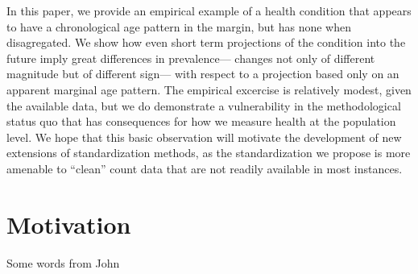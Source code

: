 \documentclass[11pt,oneside,a4paper]{article} %
\begin{document}
In this paper, we provide an empirical example of a health condition that
appears to have a chronological age pattern in the margin, but has none when
disagregated. We show how even short term projections of the
condition into the future imply great differences in prevalence--- changes not only of different magnitude but
of different sign--- with respect to a projection based only on an
apparent marginal age pattern. The empirical excercise is relatively modest,
given the available data, but we do demonstrate a vulnerability in the
methodological status quo that has consequences for how we measure health at the
population level. We hope that this basic observation will motivate the
development of new extensions of standardization methods, as the standardization
we propose is more amenable to ``clean'' count data that are not readily
available in most instances.

\section*{Motivation}
Some words from John
\end{document}
